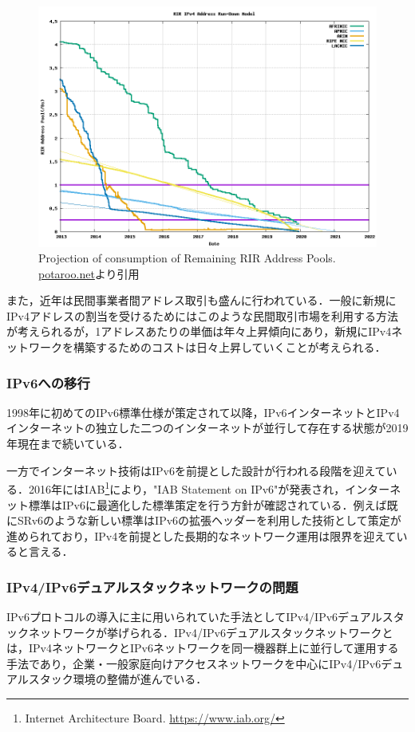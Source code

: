 \begin{figure}
	\centering
	\includegraphics[width=12cm]{img/plotend.png}
	\caption{Projection of consumption of Remaining RIR Address Pools. \url{potaroo.net}より引用\cite{potaroo_IPv4}}
	\label{fig:potaroo_IPv4}
\end{figure}
    
また，近年は民間事業者間アドレス取引も盛んに行われている．一般に新規にIPv4アドレスの割当を受けるためにはこのような民間取引市場を利用する方法が考えられるが，1アドレスあたりの単価は年々上昇傾向にあり\cite{howard2013internet}，新規にIPv4ネットワークを構築するためのコストは日々上昇していくことが考えられる．


\subsubsection{IPv6への移行}
\label{introduction:background:ipv6_transition}
1998年に初めてのIPv6標準仕様が策定されて以降\cite{RFC2460}，IPv6インターネットとIPv4インターネットの独立した二つのインターネットが並行して存在する状態が2019年現在まで続いている．

一方でインターネット技術はIPv6を前提とした設計が行われる段階を迎えている．2016年にはIAB\footnote{Internet Architecture Board. \url{https://www.iab.org/}}により，"IAB Statement on IPv6"が発表され，インターネット標準はIPv6に最適化した標準策定を行う方針が確認されている\cite{IAB_statement}．例えば既にSRv6のような新しい標準はIPv6の拡張ヘッダーを利用した技術として策定が進められており，IPv4を前提とした長期的なネットワーク運用は限界を迎えていると言える．

\subsubsection{IPv4/IPv6デュアルスタックネットワークの問題}
\label{introduction:background:dualstack_problems}
IPv6プロトコルの導入に主に用いられていた手法としてIPv4/IPv6デュアルスタックネットワークが挙げられる\cite{durand2001deploying}．IPv4/IPv6デュアルスタックネットワークとは，IPv4ネットワークとIPv6ネットワークを同一機器群上に並行して運用する手法であり，企業・一般家庭向けアクセスネットワークを中心にIPv4/IPv6デュアルスタック環境の整備が進んでいる．

